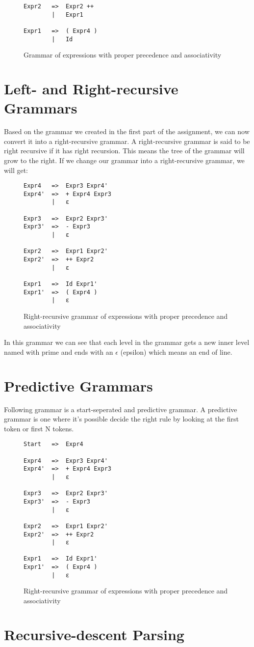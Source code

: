 \documentclass[hidelinks]{uva-inf-article}
\begin{document}
\begin{flushleft}
\begin{figure}[h]
\begin{lstlisting}
Expr2   =>  Expr2 ++ 
        |   Expr1
        
Expr1   =>  ( Expr4 ) 
        |   Id
\end{lstlisting}
\caption{Grammar of expressions with proper precedence and associativity}
\label{fig:1}
\end{figure}
\newpage
\section{Left- and Right-recursive Grammars}
\par Based on the grammar we created in the first part of the assignment, we can now convert it into a
right-recursive grammar. A right-recursive grammar is said to be right recursive if it has right recursion.
This means the tree of the grammar will grow to the right. If we change our grammar into a right-recursive grammar,
we will get:
\begin{figure}[h]
\begin{lstlisting}
Expr4   =>  Expr3 Expr4'
Expr4'  =>  + Expr4 Expr3
        |   ε
    
Expr3   =>  Expr2 Expr3'
Expr3'  =>  - Expr3
        |   ε
    
Expr2   =>  Expr1 Expr2'
Expr2'  =>  ++ Expr2
        |   ε
    
Expr1   =>  Id Expr1'
Expr1'  =>  ( Expr4 )
        |   ε
\end{lstlisting}
\caption{Right-recursive grammar of expressions with proper precedence and associativity}
\label{fig:2}
\end{figure}
\par In this grammar we can see that each level in the grammar gets a new inner level named with prime and ends with an $\epsilon{}$ (epsilon)
which means an end of line.

\section{Predictive Grammars}
Following grammar is a start-seperated and predictive grammar.
A predictive grammar is one where it's possible decide the right rule by looking at the first token or first N tokens.
\begin{figure}[h]
\begin{lstlisting}
Start   =>  Expr4

Expr4   =>  Expr3 Expr4'
Expr4'  =>  + Expr4 Expr3
        |   ε

Expr3   =>  Expr2 Expr3'
Expr3'  =>  - Expr3
        |   ε

Expr2   =>  Expr1 Expr2'
Expr2'  =>  ++ Expr2
        |   ε

Expr1   =>  Id Expr1'
Expr1'  =>  ( Expr4 )
        |   ε
\end{lstlisting}
\caption{Right-recursive grammar of expressions with proper precedence and associativity}
\label{fig:3}
\end{figure}
\newpage
\section{Recursive-descent Parsing}

\end{flushleft}
\end{document}
